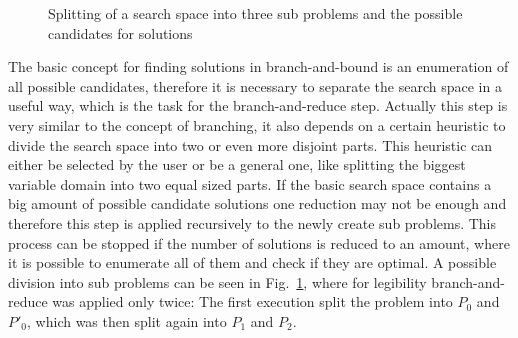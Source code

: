 \documentclass[10pt,
               a4paper,
               journal,
               ]{IEEEtran}
\newcommand{\reffig}[1]{{Fig.~\ref{#1}}}
\begin{document}
	\begin{figure}
		\center
		\caption{Splitting of a search space into three sub problems and the possible candidates for solutions}
		\label{fig:branchAndBound}
	\end{figure}
	
	The basic concept for finding solutions in branch-and-bound is an enumeration of all possible candidates, therefore it is necessary to separate the search space in a useful way, which is the task for the branch-and-reduce step. Actually this step is very similar to the concept of branching, it also depends on a certain heuristic to divide the search space into two or even more disjoint parts. This heuristic can either be selected by the user or be a general one, like splitting the biggest variable domain into two equal sized parts. If the basic search space contains a big amount of possible candidate solutions one reduction may not be enough and therefore this step is applied recursively to the newly create sub problems. This process can be stopped if the number of solutions is reduced to an amount, where it is possible to enumerate all of them and check if they are optimal. A possible division into sub problems can be seen in \reffig{fig:branchAndBound}, where for legibility branch-and-reduce was applied only twice: The first execution split the problem into $P_0$ and $P'_0$, which was then split again into $P_1$ and $P_2$.
	
\end{document}
